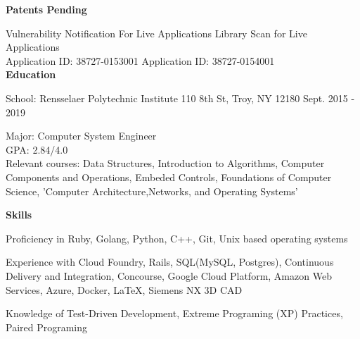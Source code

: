 \documentclass[10pt,a4papaer]{article}
\begin{document}
{\begin{itemize}[noitemsep, topsep=0pt]
	\end{itemize}
	
	\setlength{\leftskip}{0pt}
	
	{\noindent\textbf{Patents Pending}\vspace*{-20px}\\}
	
	\noindent\makebox[\linewidth]{\rule{\textwidth}{1pt}}
	Vulnerability Notification For Live Applications {\hfill Library Scan for Live Applications}\\
	Application ID: 38727-0153001 {\hfill Application ID: 38727-0154001\quad}\\
	
	{\noindent\textbf{Education}}\vspace*{-20px}\\
	
	\noindent\makebox[\linewidth]{\rule{\textwidth}{1.3pt}}
	
	{ School: Rensselaer Polytechnic Institute 110 8th St, Troy, NY 12180 {\hfill Sept. 2015 - 2019}}
	
	\setlength{\leftskip}{50pt}
	
	{\noindent Major: Computer System Engineer\\
		GPA: 2.84/4.0\\
		Relevant courses: Data Structures, Introduction to Algorithms, Computer Components and Operations, Embeded Controls, Foundations of Computer Science, 'Computer Architecture,Networks, and Operating Systems'}\\
	
	\setlength{\leftskip}{0pt}
	
	{\noindent\textbf{Skills}}\vspace*{-20px}\\
	
	\noindent\makebox[\linewidth]{\rule{\textwidth}{1.2pt}}
	
	Proficiency in Ruby, Golang, Python, C++, Git, Unix based operating systems\\
	
	\setlength{\leftskip}{15pt}
	
	{\noindent Experience with Cloud Foundry, Rails, SQL(MySQL, Postgres), Continuous Delivery and Integration, Concourse, Google Cloud Platform, Amazon Web Services, Azure, Docker, LaTeX, Siemens NX 3D CAD}\\
	
	\setlength{\leftskip}{0pt}
	
	Knowledge of Test-Driven Development, Extreme Programing (XP) Practices, Paired Programing\\
	
}
\end{document}
